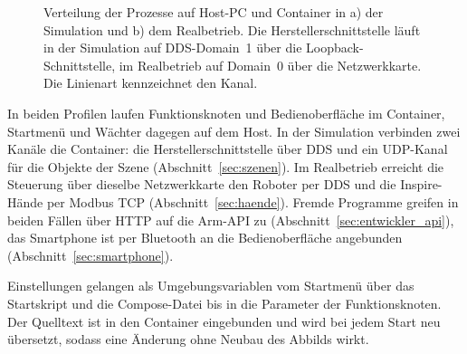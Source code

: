 \begin{figure}[htbp]
  \centering
  
  \caption[Verteilung der Prozesse auf Host und Container]{Verteilung der Prozesse auf Host-PC und Container in a) der Simulation und b) dem Realbetrieb. Die Herstellerschnittstelle läuft in der Simulation auf DDS-Domain~1 über die Loopback-Schnittstelle, im Realbetrieb auf Domain~0 über die Netzwerkkarte. Die Linienart kennzeichnet den Kanal.}
  \label{fig:verteilung}
\end{figure}

In beiden Profilen laufen Funktionsknoten und Bedienoberfläche im Container, Startmenü und Wächter dagegen auf dem Host.
In der Simulation verbinden zwei Kanäle die Container: die Herstellerschnittstelle über DDS und ein UDP-Kanal für die Objekte der Szene (Abschnitt~\ref{sec:szenen}).
Im Realbetrieb erreicht die Steuerung über dieselbe Netzwerkkarte den Roboter per DDS und die Inspire-Hände per Modbus TCP (Abschnitt~\ref{sec:haende}).
Fremde Programme greifen in beiden Fällen über HTTP auf die Arm-API zu (Abschnitt~\ref{sec:entwickler_api}), das Smartphone ist per Bluetooth an die Bedienoberfläche angebunden (Abschnitt~\ref{sec:smartphone}).

Einstellungen gelangen als Umgebungsvariablen vom Startmenü über das Startskript und die Compose-\hspace{0pt}Datei bis in die Parameter der Funktionsknoten.
Der Quelltext ist in den Container eingebunden und wird bei jedem Start neu übersetzt, sodass eine Änderung ohne Neubau des Abbilds wirkt.

